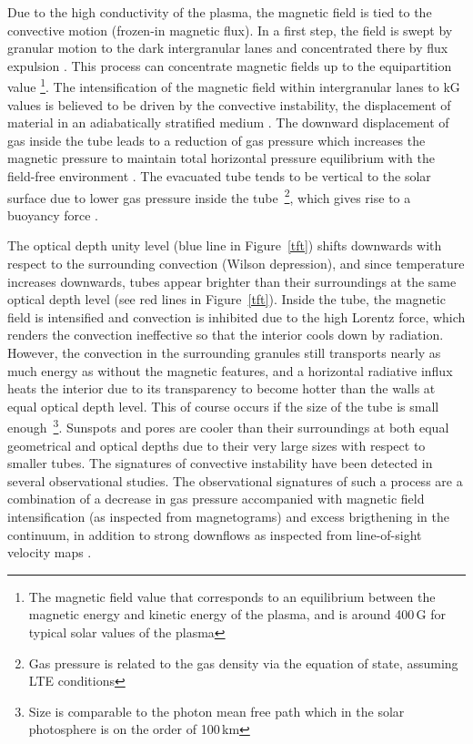 \documentclass[goettingen, gauss, print]{thesis}
\begin{document}
Due to the high conductivity of the plasma, the magnetic field is tied to the convective motion (frozen-in magnetic flux). In a first step, the field is swept by granular motion to the dark intergranular lanes and concentrated there by flux expulsion \citep{parker_kinematical_1963}. This process can concentrate magnetic fields up to the equipartition value \footnote{The magnetic field value that corresponds to an equilibrium between the magnetic energy and kinetic energy of the plasma, and is around 400\,G for typical solar values of the plasma}. The intensification of the magnetic field within intergranular lanes to kG values is believed to be driven by the convective instability, the displacement of material in an adiabatically stratified medium \citep{thomas_structure_1990}. The downward displacement of gas inside the tube leads to a reduction of gas pressure which increases the magnetic pressure to maintain total horizontal pressure equilibrium with the field-free environment \citep{parker_hydraulic_1978, spruit_convective_1979}. The evacuated tube tends to be vertical to the solar surface due to lower gas pressure inside the tube~\footnote{Gas pressure is related to the gas density via the equation of state, assuming LTE conditions}, which gives rise to a buoyancy force \citep{schussler_mhd_1986}. 


The optical depth unity level (blue line in Figure~\ref{tft}) shifts downwards with respect to the surrounding convection (Wilson depression), and since temperature increases downwards, tubes appear brighter than their surroundings at the same optical depth level (see red lines in Figure~\ref{tft}). Inside the tube, the magnetic field is intensified and convection is inhibited due to the high Lorentz force, which renders the convection ineffective so that the interior cools down by radiation. However, the convection in the surrounding granules still transports nearly as much energy as without the magnetic features, and a horizontal radiative influx heats the interior due to its transparency to become hotter than the walls at equal optical depth level. This of course occurs if the size of the tube is small enough~\footnote{Size is comparable to the photon mean free path which in the solar photosphere is on the order of 100\,km}. Sunspots and pores are cooler than their surroundings at both equal geometrical and optical depths due to their very large sizes with respect to smaller tubes. The signatures of convective instability have been detected in several observational studies. The observational signatures of such a process are a combination of a decrease in gas pressure accompanied with magnetic field intensification (as inspected from magnetograms) and excess brigthening in the continuum, in addition to strong downflows as inspected from line-of-sight velocity maps \citep{nagata_formation_2008, fischer_statistics_2009}.
\end{document}
